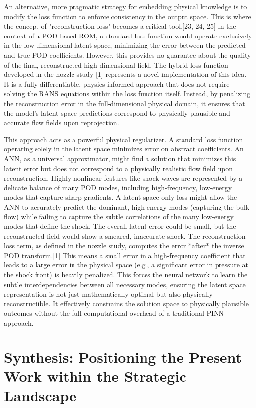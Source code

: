 \documentclass[12pt, a4paper]{report}
\begin{document}
An alternative, more pragmatic strategy for embedding physical knowledge is to modify the loss function to enforce consistency in the output space. This is where the concept of "reconstruction loss" becomes a critical tool.[23, 24, 25] In the context of a POD-based ROM, a standard loss function would operate exclusively in the low-dimensional latent space, minimizing the error between the predicted and true POD coefficients. However, this provides no guarantee about the quality of the final, reconstructed high-dimensional field. The hybrid loss function developed in the nozzle study [1] represents a novel implementation of this idea. It is a fully differentiable, physics-informed approach that does not require solving the RANS equations within the loss function itself. Instead, by penalizing the reconstruction error in the full-dimensional physical domain, it ensures that the model's latent space predictions correspond to physically plausible and accurate flow fields upon reprojection.

This approach acts as a powerful physical regularizer. A standard loss function operating solely in the latent space minimizes error on abstract coefficients. An ANN, as a universal approximator, might find a solution that minimizes this latent error but does not correspond to a physically realistic flow field upon reconstruction. Highly nonlinear features like shock waves are represented by a delicate balance of many POD modes, including high-frequency, low-energy modes that capture sharp gradients. A latent-space-only loss might allow the ANN to accurately predict the dominant, high-energy modes (capturing the bulk flow) while failing to capture the subtle correlations of the many low-energy modes that define the shock. The overall latent error could be small, but the reconstructed field would show a smeared, inaccurate shock. The reconstruction loss term, as defined in the nozzle study, computes the error *after* the inverse POD transform.[1] This means a small error in a high-frequency coefficient that leads to a large error in the physical space (e.g., a significant error in pressure at the shock front) is heavily penalized. This forces the neural network to learn the subtle interdependencies between all necessary modes, ensuring the latent space representation is not just mathematically optimal but also physically reconstructible. It effectively constrains the solution space to physically plausible outcomes without the full computational overhead of a traditional PINN approach.

\section{Synthesis: Positioning the Present Work within the Strategic Landscape}
\end{document}
